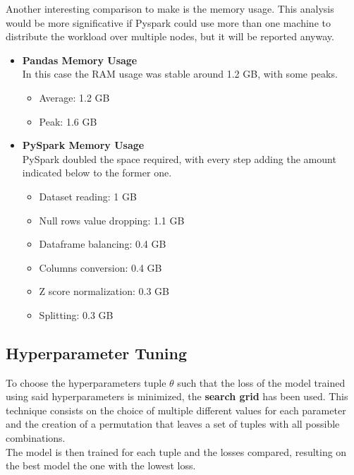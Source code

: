 \documentclass[
	letterpaper, %
	10pt, %
]{class}
\begin{document}
Another interesting comparison to make is the memory usage. This analysis would be more significative if Pyspark could use more than one machine to distribute the workload over multiple nodes, but it will be reported anyway.\\

\begin{itemize}
    \item \textbf{Pandas Memory Usage}\\
          In this case the RAM usage was stable around 1.2 GB, with some peaks.
          \begin{itemize}
              \item Average: 1.2 GB
              \item Peak: 1.6 GB
          \end{itemize}
    \item \textbf{PySpark Memory Usage}\\
          PySpark doubled the space required, with every step adding the amount indicated below to the former one.
          \begin{itemize}
              \item Dataset reading: 1 GB
              \item Null rows value dropping: 1.1 GB
              \item Dataframe balancing: 0.4 GB
              \item Columns conversion: 0.4 GB
              \item Z score normalization: 0.3 GB
              \item Splitting: 0.3 GB
          \end{itemize}
\end{itemize}


\subsection{Hyperparameter Tuning}
To choose the hyperparameters tuple $\theta$ such that the loss of the model trained using said hyperparameters is minimized, the \textbf{search grid} has been used.
This technique consists on the choice of multiple different values for each parameter and the creation of a permutation that leaves a set of tuples with all possible combinations.\\
The model is then trained for each tuple and the losses compared, resulting on the best model the one with the lowest loss.
\end{document}

